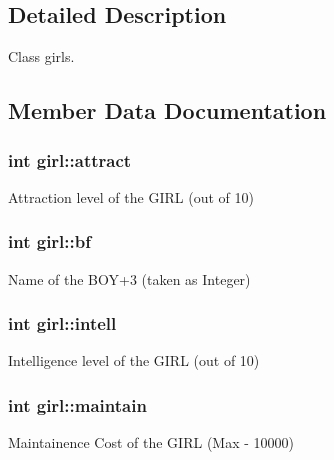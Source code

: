 \subsection{Detailed Description}
Class girls. 

\subsection{Member Data Documentation}
\hypertarget{classgirl_ad75ed7e0a60b5d4723ceffe5df47be83}{
\subsubsection[{attract}]{\setlength{\rightskip}{0pt plus 5cm}int girl\-::attract}}\label{classgirl_ad75ed7e0a60b5d4723ceffe5df47be83}


Attraction level of the G\-I\-R\-L (out of 10) 

\hypertarget{classgirl_ad1ae153d6910d8ea54ee89d80d182616}{
\subsubsection[{bf}]{\setlength{\rightskip}{0pt plus 5cm}int girl\-::bf}}\label{classgirl_ad1ae153d6910d8ea54ee89d80d182616}


Name of the B\-O\-Y+3 (taken as Integer) 

\hypertarget{classgirl_a8412e2e3a1a3c58bf1bbef7028bdce93}{
\subsubsection[{intell}]{\setlength{\rightskip}{0pt plus 5cm}int girl\-::intell}}\label{classgirl_a8412e2e3a1a3c58bf1bbef7028bdce93}


Intelligence level of the G\-I\-R\-L (out of 10) 

\hypertarget{classgirl_ab435cbd480a002857ae406e47dd513f3}{
\subsubsection[{maintain}]{\setlength{\rightskip}{0pt plus 5cm}int girl\-::maintain}}\label{classgirl_ab435cbd480a002857ae406e47dd513f3}


Maintainence Cost of the G\-I\-R\-L (Max -\/ 10000) 

